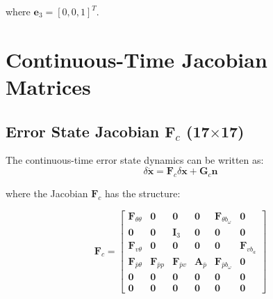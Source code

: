\documentclass[11pt,a4paper]{article}
\newcommand{\I}{\mathbf{I}}
\begin{document}
where $\mathbf{e}_3 = [0, 0, 1]^T$.

\section{Continuous-Time Jacobian Matrices}

\subsection{Error State Jacobian $\mathbf{F}_c$ (17$\times$17)}
The continuous-time error state dynamics can be written as:
\begin{equation}
    \delta\dot{\mathbf{x}} = \mathbf{F}_c \delta\mathbf{x} + \mathbf{G}_c \mathbf{n}
\end{equation}

where the Jacobian $\mathbf{F}_c$ has the structure:

\begin{equation}
\mathbf{F}_c = \begin{bmatrix}
    \mathbf{F}_{\theta\theta} & \mathbf{0} & \mathbf{0} & \mathbf{0} & \mathbf{F}_{\theta b_\omega} & \mathbf{0} \\
    \mathbf{0} & \mathbf{0} & \I_3 & \mathbf{0} & \mathbf{0} & \mathbf{0} \\
    \mathbf{F}_{v\theta} & \mathbf{0} & \mathbf{0} & \mathbf{0} & \mathbf{0} & \mathbf{F}_{v b_a} \\
    \mathbf{F}_{\bar{p}\theta} & \mathbf{F}_{\bar{p}p} & \mathbf{F}_{\bar{p}v} & \mathbf{A}_{\bar{p}} & \mathbf{F}_{\bar{p}b_\omega} & \mathbf{0} \\
    \mathbf{0} & \mathbf{0} & \mathbf{0} & \mathbf{0} & \mathbf{0} & \mathbf{0} \\
    \mathbf{0} & \mathbf{0} & \mathbf{0} & \mathbf{0} & \mathbf{0} & \mathbf{0}
\end{bmatrix}
\end{equation}
\end{document}
